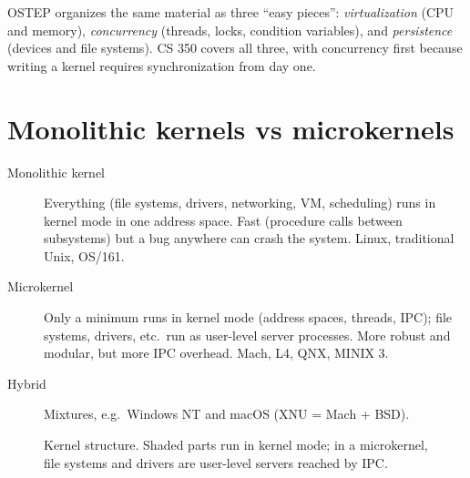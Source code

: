 \begin{aside}
OSTEP organizes the same material as three ``easy pieces'': \emph{virtualization} (CPU and
memory), \emph{concurrency} (threads, locks, condition variables), and \emph{persistence}
(devices and file systems). CS 350 covers all three, with concurrency first because writing a
kernel requires synchronization from day one.
\end{aside}

\section{Monolithic kernels vs microkernels}

\begin{description}
  \item[Monolithic kernel] Everything (file systems, drivers, networking, VM, scheduling) runs
    in kernel mode in one address space. Fast (procedure calls between subsystems) but a bug
    anywhere can crash the system. Linux, traditional Unix, OS/161.
  \item[Microkernel] Only a minimum runs in kernel mode (address spaces, threads, IPC);
    file systems, drivers, etc.\ run as user-level server processes. More robust and modular,
    but more IPC overhead. Mach, L4, QNX, MINIX 3.
  \item[Hybrid] Mixtures, e.g.\ Windows NT and macOS (XNU = Mach + BSD).
\end{description}

\begin{figure}[H]
\centering
{}
\caption{Kernel structure. Shaded parts run in kernel mode; in a
microkernel, file systems and drivers are user-level servers reached by IPC.}
\end{figure}


